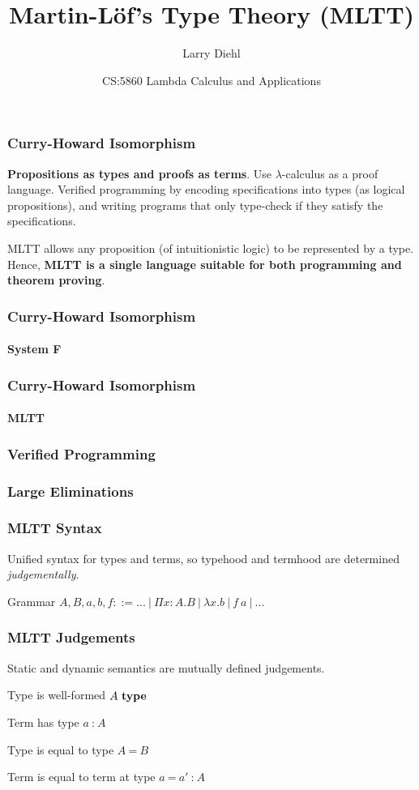 \documentclass[mathserif]{beamer}
\title{Martin-L{\"o}f's Type Theory (MLTT)}
\author{Larry Diehl}
\institute{University of Iowa - Guest Lecture}
\date[April 26, 2018]
{CS:5860 Lambda Calculus and Applications}
\newcommand{\istype}[1]{\ensuremath{#1 ~\textbf{\textrm{type}}}}
\newcommand{\isterm}[2]{\ensuremath{#1 ~\textbf{{:}}~ #2}}
\newcommand{\eqtype}[2]{\ensuremath{#1 ~\textbf{=}~ #2}}
\newcommand{\eqterm}[3]{\ensuremath{#1 ~\textbf{=}~ #2 ~\textbf{{:}}~ #3}}
\newcommand{\Funv}[3]{\ensuremath{\Pi #1{:}#2. #3}}
\newcommand{\Fun}[2]{\Funv{x}{#1}{#2}}
\newcommand{\funv}[2]{\ensuremath{\lambda #1. #2}}
\newcommand{\fun}[1]{\funv{x}{#1}}
\newcommand{\app}[2]{\ensuremath{#1~#2}}
\begin{document}
\frame{\titlepage}

\begin{frame}
\frametitle{Curry-Howard Isomorphism}

\textbf{Propositions as types and proofs as terms}.
Use $\lambda$-calculus as a proof language.
Verified programming by encoding specifications
into types (as logical propositions), and
writing programs that only type-check if they
satisfy the specifications.

MLTT allows any proposition (of intuitionistic logic)
to be represented by a type.
Hence, \textbf{MLTT is a single language
suitable for both programming and theorem proving}.

\end{frame}


\begin{frame}
\frametitle{Curry-Howard Isomorphism}
\framesubtitle{System F}

\end{frame}

\begin{frame}
\frametitle{Curry-Howard Isomorphism}
\framesubtitle{MLTT}

\end{frame}

\begin{frame}
\frametitle{Verified Programming}

\end{frame}


\begin{frame}
\frametitle{Large Eliminations}

\end{frame}

\begin{frame}
\frametitle{MLTT Syntax}

Unified syntax for types and terms,
so typehood and termhood are determined \textit{judgementally}.

\begin{block}{Grammar}
$A,B,a,b,f ::= ...~|~\Fun{A}{B}~|~\fun{b}~|~\app{f}{a}~|~...$
\end{block}

\end{frame}


\begin{frame}
\frametitle{MLTT Judgements}

Static and dynamic semantics are mutually defined judgements.

\begin{block}{Type is well-formed}
\istype{A}
\end{block}

\begin{block}{Term has type}
\isterm{a}{A}
\end{block}

\begin{block}{Type is equal to type}
\eqtype{A}{B}
\end{block}

\begin{block}{Term is equal to term at type}
\eqterm{a}{a'}{A}
\end{block}


\end{frame}
\end{document}
